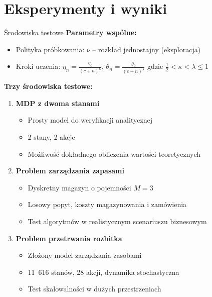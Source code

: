 \section{Eksperymenty i wyniki}

\begin{frame}{Środowiska testowe}
\textbf{Parametry wspólne:}
\begin{itemize}
    \item Polityka próbkowania: $\nu$ -- rozkład jednostajny (eksploracja)
    \item Kroki uczenia: $\eta_n = \frac{\eta_0}{(c + n)^{\kappa}}$, $\theta_n = \frac{\theta_0}{(c + n)^{\lambda}}$ gdzie $\frac{1}{2} < \kappa < \lambda \le 1$
\end{itemize}

\vspace{0.5em}
\textbf{Trzy środowiska testowe:}
\begin{enumerate}
    \item \textbf{MDP z dwoma stanami}
    \begin{itemize}
        \item Prosty model do weryfikacji analitycznej
        \item 2 stany, 2 akcje
        \item Możliwość dokładnego obliczenia wartości teoretycznych
    \end{itemize}
    
    \vspace{0.3em}
    \item \textbf{Problem zarządzania zapasami}
    \begin{itemize}
        \item Dyskretny magazyn o pojemności $M=3$
        \item Losowy popyt, koszty magazynowania i zamówienia
        \item Test algorytmów w realistycznym scenariuszu biznesowym
    \end{itemize}
    
    \vspace{0.3em}
    \item \textbf{Problem przetrwania rozbitka}
    \begin{itemize}
        \item Złożony model zarządzania zasobami
        \item 11~616 stanów, 28 akcji, dynamika stochastyczna
        \item Test skalowalności w dużych przestrzeniach
    \end{itemize}
\end{enumerate}
\end{frame}

